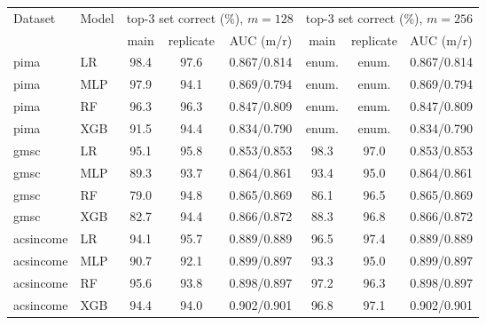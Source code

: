 \begin{tabular}{llcccccc}
\toprule
Dataset & Model & \multicolumn{3}{c}{top-3 set correct (\%), $m{=}128$} & \multicolumn{3}{c}{top-3 set correct (\%), $m{=}256$}\\
\cmidrule(lr){3-5}\cmidrule(lr){6-8}
 & & main & replicate & AUC (m/r) & main & replicate & AUC (m/r)\\
\midrule
pima & LR & 98.4 & 97.6 & 0.867/0.814 & enum. & enum. & 0.867/0.814\\
pima & MLP & 97.9 & 94.1 & 0.869/0.794 & enum. & enum. & 0.869/0.794\\
pima & RF & 96.3 & 96.3 & 0.847/0.809 & enum. & enum. & 0.847/0.809\\
pima & XGB & 91.5 & 94.4 & 0.834/0.790 & enum. & enum. & 0.834/0.790\\
gmsc & LR & 95.1 & 95.8 & 0.853/0.853 & 98.3 & 97.0 & 0.853/0.853\\
gmsc & MLP & 89.3 & 93.7 & 0.864/0.861 & 93.4 & 95.0 & 0.864/0.861\\
gmsc & RF & 79.0 & 94.8 & 0.865/0.869 & 86.1 & 96.5 & 0.865/0.869\\
gmsc & XGB & 82.7 & 94.4 & 0.866/0.872 & 88.3 & 96.8 & 0.866/0.872\\
acsincome & LR & 94.1 & 95.7 & 0.889/0.889 & 96.5 & 97.4 & 0.889/0.889\\
acsincome & MLP & 90.7 & 92.1 & 0.899/0.897 & 93.3 & 95.0 & 0.899/0.897\\
acsincome & RF & 95.6 & 93.8 & 0.898/0.897 & 97.2 & 96.3 & 0.898/0.897\\
acsincome & XGB & 94.4 & 94.0 & 0.902/0.901 & 96.8 & 97.1 & 0.902/0.901\\
\bottomrule
\end{tabular}